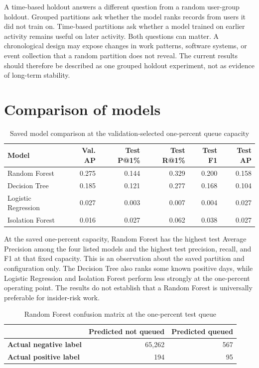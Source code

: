 A time-based holdout answers a different question from a random
user-group holdout. Grouped partitions ask whether the model ranks
records from users it did not train on. Time-based partitions ask
whether a model trained on earlier activity remains useful on later
activity. Both questions can matter. A chronological design may expose
changes in work patterns, software systems, or event collection that a
random partition does not reveal. The current results should therefore
be described as one grouped holdout experiment, not as evidence of
long-term stability.

\section{Comparison of models}
\begin{table}[H]
\centering
\tablefont
\caption{Saved model comparison at the validation-selected one-percent queue capacity}
\label{tab:model-results}
\begin{tabularx}{\textwidth}{|p{}|R|R|R|R|R|}
\hline
\textbf{Model} & \textbf{Val. AP} & \textbf{Test P@1\%} & \textbf{Test R@1\%} & \textbf{Test F1} & \textbf{Test AP}\\\hline
Random Forest & 0.275 & 0.144 & 0.329 & 0.200 & 0.158\\\hline
Decision Tree & 0.185 & 0.121 & 0.277 & 0.168 & 0.104\\\hline
Logistic Regression & 0.027 & 0.003 & 0.007 & 0.004 & 0.027\\\hline
Isolation Forest & 0.016 & 0.027 & 0.062 & 0.038 & 0.027\\\hline
\end{tabularx}
\end{table}

At the saved one-percent capacity, Random Forest has the highest test
Average Precision among the four listed models and the highest test
precision, recall, and F1 at that fixed capacity. This is an
observation about the saved partition and configuration only. The
Decision Tree also ranks some known positive days, while Logistic
Regression and Isolation Forest perform less strongly at the
one-percent operating point. The results do not establish that a
Random Forest is universally preferable for insider-risk work.

\begin{table}[H]
\centering
\tablefont
\caption{Random Forest confusion matrix at the one-percent test queue}
\label{tab:rf-confusion}
\begin{tabularx}{0.8\textwidth}{|p{}|R|R|}
\hline
 & \textbf{Predicted not queued} & \textbf{Predicted queued}\\\hline
\textbf{Actual negative label} & 65,262 & 567\\\hline
\textbf{Actual positive label} & 194 & 95\\\hline
\end{tabularx}
\end{table}


